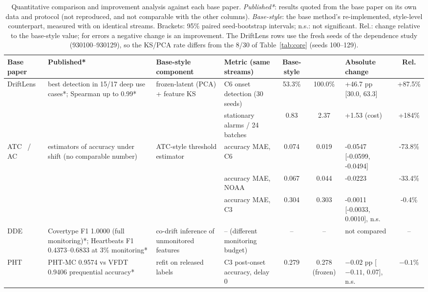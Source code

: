 \begin{table}[t]
\centering
\caption{Quantitative comparison and improvement analysis against each base paper. \emph{Published*}: results quoted from the base paper on its own data and protocol (not reproduced, and not comparable with the other columns). \emph{Base-style}: the base method's re-implemented, style-level counterpart, measured with \idm{} on identical streams. Brackets: 95\% paired seed-bootstrap intervals; n.s.: not significant. Rel.: change relative to the base-style value; for errors a negative change is an improvement. The DriftLens rows use the fresh seeds of the dependence study (930100--930129), so the KS/PCA rate differs from the 8/30 of Table~\ref{tab:core} (seeds 100--129).}
\label{tab:improvement}
\setlength{\tabcolsep}{3pt}
\footnotesize
\begin{tabular}{L{1.7cm}L{2.7cm}L{2.3cm}L{2.5cm}ccL{2.3cm}c}
\toprule
Base paper & Published* & Base-style component & Metric (same streams) & Base-style & \idm{} & Absolute change & Rel. \\
\midrule
DriftLens~\cite{greco2025driftlens} & best detection in 15/17 deep use cases*; Spearman up to 0.99* & frozen-latent (PCA) + feature KS & C6 onset detection (30 seeds) & 53.3\% & 100.0\% & +46.7 pp [30.0, 63.3] & +87.5\% \\
 & & & stationary alarms / 24 batches & 0.83 & 2.37 & +1.53 (cost) &+184\% \\
ATC~\cite{garg2022atc} / AC~\cite{kivimaki2025confidence} & estimators of accuracy under shift (no comparable number) & ATC-style threshold estimator & accuracy MAE, C6 & 0.074 & 0.019 & -0.0547 [-0.0599, -0.0494] & -73.8\% \\
 & & & accuracy MAE, NOAA &0.067 & 0.044 & -0.0223 & -33.4\% \\
 & & & accuracy MAE, C3 &0.304 & 0.303 & -0.0011 [-0.0033, 0.0010], n.s. & -0.4\% \\
DDE~\cite{szucs2025dde} & Covertype F1 1.0000 (full monitoring)*; Heartbeats F1 0.4373--0.6833 at 3\% monitoring* & co-drift inference of unmonitored features & -- (different monitoring budget) & -- & -- & not compared & -- \\
PHT~\cite{guerrerocano2026proactive} & PHT-MC 0.9574 vs VFDT 0.9406 prequential accuracy* & refit on released labels & C3 post-onset accuracy, delay 0 & 0.279 & 0.278 (frozen) & $-0.02$ pp [$-0.11$, 0.07], n.s. & $-0.1$\% \\
\bottomrule
\end{tabular}
\end{table}
